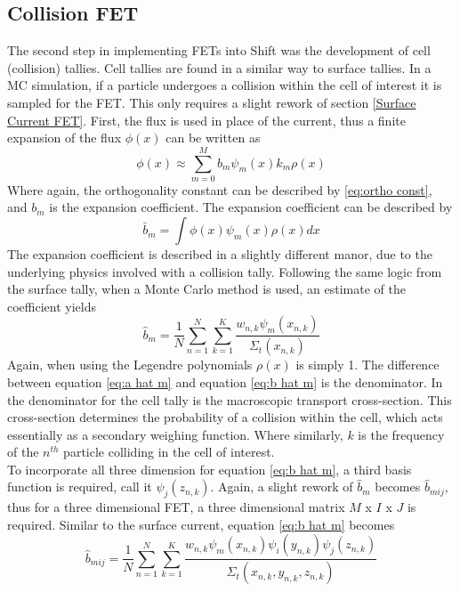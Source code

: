 \documentclass[10tma4paper]{article}
\begin{document}
\subsection{Collision FET}\label{Cell Tally}
The second step in implementing FETs into Shift was the development of cell (collision)  tallies. Cell tallies are found in a similar way to surface tallies. In a MC simulation, if a particle undergoes a collision within the cell of interest it is sampled for the FET. This only requires a slight rework of section \eqref{Surface Current FET}. First, the flux is used in place of the current, thus a finite expansion of the flux $\phi(x)$ can be written as
\begin{equation}
\phi(x) \approx \sum_{m=0}^{M}b_{m}\psi_{m}(x)k_{m}\rho(x)
\end{equation}
Where again, the orthogonality constant can be described by \eqref{eq:ortho const}, and $b_{m}$ is the expansion coefficient. The expansion coefficient can be described by
 \begin{equation} \label{eq:b bar m}
 \bar{b}_{m}=\int \phi(x)\psi_{m}(x)\rho(x)dx
 \end{equation}
The expansion coefficient is described in a slightly different manor, due to the underlying physics involved with a collision tally. Following the same logic from the surface tally, when a Monte Carlo method is used, an estimate of the coefficient yields
	 \begin{equation} \label{eq:b hat m}
	 \hat{b}_{m}=\frac{1}{N}\sum_{n=1}^{N}\sum_{k=1}^{K}\frac{w_{n,k}\psi_{m}(x_{n,k})}{\Sigma_{t}(x_{n,k})}
	 \end{equation}
Again, when using the Legendre polynomials 
$\rho(x)$ is simply 1. The difference between equation \eqref{eq:a hat m} and equation \eqref{eq:b hat m} is the denominator. In the denominator for the cell tally is the macroscopic transport cross-section. This cross-section determines the probability of a collision within the cell, which acts essentially as a secondary weighing function. Where similarly, $k$ is the frequency of the $n^{th}$ particle colliding in the cell of interest.
\\
To incorporate all three dimension for equation \eqref{eq:b hat m}, a third basis function is required, call it $\psi_j(z_{n,k})$. Again, a slight rework of $\hat{b}_{m}$ becomes $\hat{b}_{mij}$, thus for a three dimensional FET, a three dimensional matrix $M$ x $I$ x $J$ is required. Similar to the surface current, equation \eqref{eq:b hat m} becomes
	 \begin{equation} \label{eq:b hat m i j}
	 \hat{b}_{mij}=\frac{1}{N}\sum_{n=1}^{N}\sum_{k=1}^{K}\frac{w_{n,k}\psi_{m}(x_{n,k})\psi_{i}(y_{n,k})\psi_{j}(z_{n,k})}{\Sigma_{t}(x_{n,k},y_{n,k},z_{n,k})}
	 \end{equation}
\end{document}
